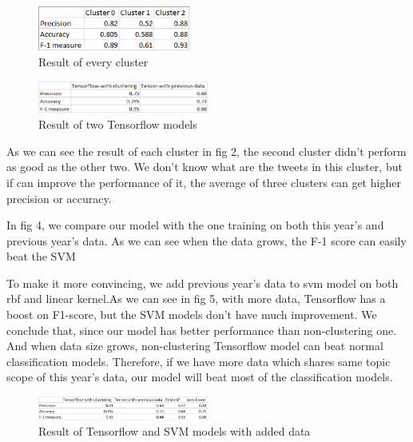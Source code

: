 \documentclass[conference]{IEEEtran}
\begin{document}
\begin{figure}[h]
\centering
\includegraphics[width=50mm]{Capture(3)}
\caption{Result of every cluster}

\end{figure}

\begin{figure}[h]
\centering
\includegraphics[width=0.5\textwidth]{Capture(4)}
\caption{Result of two Tensorflow models}

\end{figure}


As we can see the result of each cluster in fig 2, the second cluster didn't perform as good as the other two. We don't know what are the tweets in this cluster, but if can improve the performance of it, the average of three clusters can get higher precision or accuracy.


In fig 4, we compare our model with the one training on both this year's and previous year's data. As we can see when the data grows, the F-1 score can easily beat the SVM 


To make it more convincing, we add previous year's data to svm model on both rbf and linear kernel.As we can see in fig 5, with more data, Tensorflow has a boost on F1-score, but the SVM models don't have much improvement. We conclude that, since our model has better performance than non-clustering one. And when data size grows, non-clustering Tensorflow model can beat normal classification models. Therefore, if we have more data which shares same topic scope of this year's data, our model will beat most of the classification models.

\begin{figure}[h]
\centering
\includegraphics[width=0.5\textwidth]{Capture(5)}
\caption{Result of Tensorflow and SVM models with added data}

\end{figure}
\end{document}
